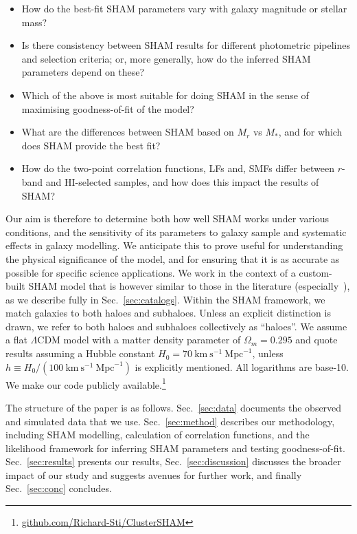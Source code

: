 \documentclass[usenatbib,useAMS]{mnras}
\begin{document}
% 
\begin{itemize}
    \item How do the best-fit \ac{SHAM} parameters vary with galaxy magnitude or stellar mass?
    \item Is there consistency between \ac{SHAM} results for different photometric pipelines and selection criteria; or, more generally, how do the inferred \ac{SHAM} parameters depend on these?
    \item Which of the above is most suitable for doing \ac{SHAM} in the sense of maximising goodness-of-fit of the model?
    \item What are the differences between \ac{SHAM} based on $M_r$ vs $M_*$, and for which does \ac{SHAM} provide the best fit?
    \item How do the two-point correlation functions, \acp{LF} and, \acp{SMF} differ between $r$-band and HI-selected samples, and how does this impact the results of \ac{SHAM}?
\end{itemize}

% 
Our aim is therefore to determine both how well \ac{SHAM} works under various conditions, and the sensitivity of its parameters to galaxy sample and systematic effects in galaxy modelling. We anticipate this to prove useful for understanding the physical significance of the model, and for ensuring that it is as accurate as possible for specific science applications. We work in the context of a custom-built \ac{SHAM} model that is however similar to those in the literature (especially~\citealt{Lehmann}), as we describe fully in Sec.~\ref{sec:catalogs}.
Within the \ac{SHAM} framework, we match galaxies to both haloes and subhaloes. Unless an explicit distinction is drawn, we refer to both haloes and subhaloes collectively as ``haloes''. We assume a flat $\Lambda$CDM model with a matter density parameter of $\Omega_m = 0.295$ and quote results assuming a Hubble constant $H_0 = 70~\mathrm{km}~ \mathrm{s}^{-1}~\mathrm{Mpc}^{-1}$, unless $h \equiv H_0 / (100~\mathrm{km}~ \mathrm{s}^{-1}~\mathrm{Mpc}^{-1})$ is explicitly mentioned. All logarithms are base-10. We make our code publicly available.\footnote{\href{https://github.com/Richard-Sti/ClusterSHAM}{github.com/Richard-Sti/ClusterSHAM}}

The structure of the paper is as follows. Sec.~\ref{sec:data} documents the observed and simulated data that we use. Sec.~\ref{sec:method} describes our methodology, including \ac{SHAM} modelling, calculation of correlation functions, and the likelihood framework for inferring \ac{SHAM} parameters and testing goodness-of-fit. Sec.~\ref{sec:results} presents our results, Sec.~\ref{sec:discussion} discusses the broader impact of our study and suggests avenues for further work, and finally Sec.~\ref{sec:conc} concludes.
\end{document}
